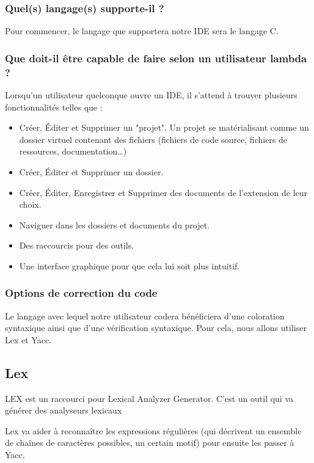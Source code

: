 \documentclass[a4paper,12pt]{article}
\begin{document}
\subsubsection{Quel(s) langage(s) supporte-il ?}

Pour commencer, le langage que supportera notre IDE sera le langage C.

\subsubsection{Que doit-il être capable de faire selon un utilisateur lambda ?}

Lorsqu'un utilisateur quelconque  ouvre un IDE, il  s'attend à trouver
plusieurs fonctionnalités telles que :

\begin{itemize}
\item  Créer,   Éditer  et  Supprimer   un  "projet".  Un   projet  se
  matérialisant  comme  un  dossier  virtuel  contenant  des  fichiers
  (fichiers    de    code     source,    fichiers    de    ressources,
  documentation\dots)
\item Créer, Éditer et Supprimer un dossier.
\item  Créer,  Éditer,  Enregistrer  et  Supprimer  des  documents  de
  l'extension de leur choix.
\item Naviguer dans les dossiers et documents du projet.
\item Des raccourcis pour des outils.
\item Une interface graphique pour que cela lui soit plus intuitif.
\end{itemize}

\subsubsection{Options de correction du code}

Le  langage avec  lequel  notre utilisateur  codera bénéficiera  d'une
coloration syntaxique  ainsi que  d'une vérification  syntaxique. Pour
cela, nous allons utiliser Lex et Yacc.

\subsection{Lex}

LEX est un raccourci pour Lexical Analyzer Generator. C'est un outil qui va générer des analyseurs lexicaux 

Lex va aider à reconnaître les expressions régulières (qui décrivent un ensemble de chaînes de caractères possibles, un certain motif) pour ensuite les passer à Yacc.
\end{document}
